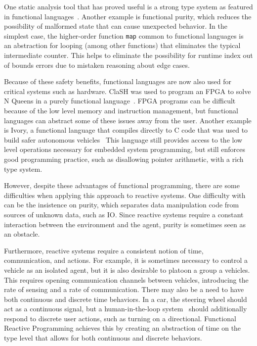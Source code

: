 One static analysis tool that has proved useful is a strong type system as featured in functional languages~\cite{cardelli1996type}.
Another example is functional purity, which reduces the possibility of malformed state that can cause unexpected behavior.
In the simplest case, the higher-order function \texttt{map} common to functional languages is an abstraction for looping (among other functions) that eliminates the typical intermediate counter.
This helps to eliminate the possibility for runtime index out of bounds errors due to mistaken reasoning about edge cases.

Because of these safety benefits, functional languages are now also used for critical systems such as hardware.
ClaSH was used to program an FPGA to solve N Queens in a purely functional language~\cite{clash2014}.
FPGA programs can be difficult because of the low level memory and instruction management, but functional languages can abstract some of these issues away from the user.
Another example is Ivory, a functional language that compiles directly to C code that was used to build safer autonomous vehicles~\cite{pike2014}
This language still provides access to the low level operations necessary for embedded system programming, but still enforces good programming practice, such as disallowing pointer arithmetic, with a rich type system.

However, despite these advantages of functional programming, there are some difficulties when applying this approach to reactive systems.
One difficulty with can be the insistence on purity, which separates data manipulation code from sources of unknown data, such as IO.
Since reactive systems require a constant interaction between the environment and the agent, purity is sometimes seen as an obstacle.

Furthermore, reactive systems require a consistent notion of time, communication, and actions.
For example, it is sometimes necessary to control a vehicle as an isolated agent, but it is also desirable to platoon a group a vehicles.
This requires opening communication channels between vehicles, introducing the rate of sensing and a rate of communication.
There may also be a need to have both continuous and discrete time behaviors.
In a car, the steering wheel should act as a continuous signal, but a human-in-the-loop system~\cite{li2014synthesis} should additionally respond to discrete user actions, such as turning on a directional.
Functional Reactive Programming achieves this by creating an abstraction of time on the type level that allows for both continuous and discrete behaviors.

